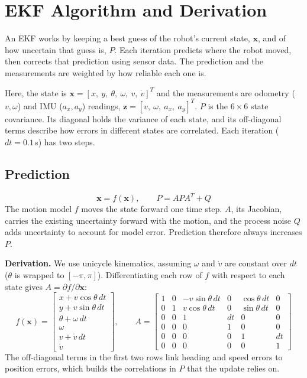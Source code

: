 \documentclass[11pt]{article}
\begin{document}
\section*{EKF Algorithm and Derivation}

An EKF works by keeping a best guess of the robot's current state, $\bm{x}$, and of how
uncertain that guess is, $P$. Each iteration predicts where the robot moved, then corrects
that prediction using sensor data. The prediction and the measurements are weighted by how
reliable each one is.

Here, the state is $\bm{x} = [x,\ y,\ \theta,\ \omega,\ v,\ \dot v]^T$ and the
measurements are odometry ($v,\omega$) and IMU ($a_x,a_y$) readings,
$\bm{z} = [v,\ \omega,\ a_x,\ a_y]^T$. $P$ is the $6\times6$ state covariance. Its diagonal
holds the variance of each state, and its off-diagonal terms describe how errors in
different states are correlated. Each iteration ($dt = 0.1$\,s) has two steps.

\subsection*{Prediction}
\begin{equation*}
\bm{x} = f(\bm{x}), \qquad P = APA^T + Q
\end{equation*}
The motion model $f$ moves the state forward one time step. $A$, its Jacobian, carries
the existing uncertainty forward with the motion, and the process noise $Q$ adds
uncertainty to account for model error. Prediction therefore always increases $P$.

\textbf{Derivation.} We use unicycle kinematics, assuming $\omega$ and $\dot v$ are
constant over $dt$ ($\theta$ is wrapped to $[-\pi,\pi]$). Differentiating each row of
$f$ with respect to each state gives $A = \partial f/\partial\bm{x}$:
\begin{equation*}
f(\bm{x}) =
\begin{bmatrix}
x + v\cos\theta\,dt \\ y + v\sin\theta\,dt \\ \theta + \omega\,dt \\ \omega \\ v + \dot v\,dt \\ \dot v
\end{bmatrix},
\qquad
A =
\begin{bmatrix}
1 & 0 & -v\sin\theta\,dt & 0 & \cos\theta\,dt & 0\\
0 & 1 & v\cos\theta\,dt & 0 & \sin\theta\,dt & 0\\
0 & 0 & 1 & dt & 0 & 0\\
0 & 0 & 0 & 1 & 0 & 0\\
0 & 0 & 0 & 0 & 1 & dt\\
0 & 0 & 0 & 0 & 0 & 1
\end{bmatrix}
\end{equation*}
The off-diagonal terms in the first two rows link heading and speed errors to position
errors, which builds the correlations in $P$ that the update relies on.
\end{document}
